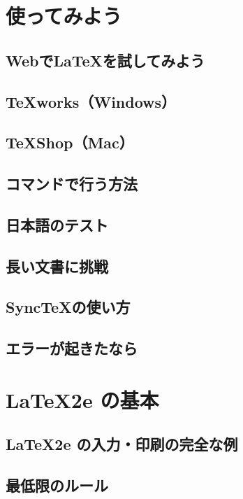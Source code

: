 \documentclass{jsbook}
\begin{document}
\chapter{使ってみよう}

\section{Webで\LaTeX を試してみよう}

\section{TeXworks（Windows）}

\section{TeXShop（Mac）}

\section{コマンドで行う方法}

\section{日本語のテスト}

\section{長い文書に挑戦}

\section{Sync\TeX の使い方}

\section{エラーが起きたなら}

\chapter{\LaTeX 2e の基本}

\section{\LaTeX 2e の入力・印刷の完全な例}

\section{最低限のルール}
\end{document}
